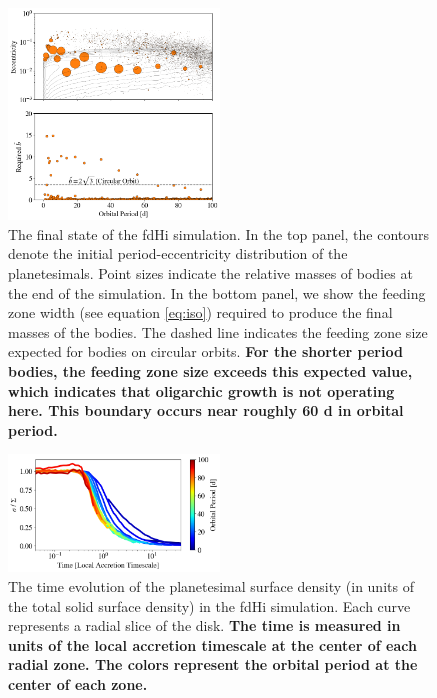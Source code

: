 \documentclass[twocolumn,linenumbers]{aastex63}
\begin{document}
\begin{figure}
\begin{center}
    \includegraphics[width=0.5\textwidth]{figures/fulldisk_e_m_b.png}
    \caption{The final state of the fdHi simulation. In the top panel,
      the contours denote the initial period-eccentricity distribution
      of the planetesimals. Point sizes indicate the relative masses
      of bodies at the end of the simulation. In the bottom panel, we show the
      feeding zone width (see equation \ref{eq:iso}) required to produce
      the final masses of the bodies. The dashed line indicates the feeding
      zone size expected for bodies on circular orbits. \textbf{For the shorter period bodies,
      the feeding zone size exceeds this expected value, which indicates that oligarchic growth is
      not operating here. This boundary occurs near roughly 60 d in orbital period.}\label{fig:fulldisk_e_m}}
\end{center}
\end{figure}

\begin{figure}
\begin{center}
    \includegraphics[width=0.5\textwidth]{figures/pl_frac_time.png}
    \caption{The time evolution of the planetesimal surface density (in units of the total solid surface density) in the fdHi 
    simulation. Each curve represents a radial slice of the disk. \textbf{The time is measured in units of the local accretion 
    timescale at the center of each radial zone. The colors represent the orbital period at the center of each zone.}\label{fig:pl_frac_time}}
\end{center}
\end{figure}
\end{document}
